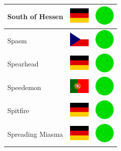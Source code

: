 \documentclass[12pt, a4paper, twoside]{report}
\begin{document}
\begin{center}
\begin{longtable}{|p{5cm}|p{2cm}|p{2cm}|}
 South of Hessen                                            & \includegraphics[width=1cm]{../img/flags/de} &   \includegraphics[width=1cm]{../likes/y} \\ \hline
 Spasm                                                      & \includegraphics[width=1cm]{../img/flags/cz} &   \includegraphics[width=1cm]{../likes/y} \\ \hline
 Spearhead                                                  & \includegraphics[width=1cm]{../img/flags/de} &   \includegraphics[width=1cm]{../likes/y} \\ \hline
 Speedemon                                                  & \includegraphics[width=1cm]{../img/flags/pt} &   \includegraphics[width=1cm]{../likes/y} \\ \hline
 Spitfire                                                   & \includegraphics[width=1cm]{../img/flags/de} &   \includegraphics[width=1cm]{../likes/y} \\ \hline
 Spreading Miasma                                           & \includegraphics[width=1cm]{../img/flags/de} &   \includegraphics[width=1cm]{../likes/y} \\ \hline

\end{longtable}
\end{center}
\end{document}

